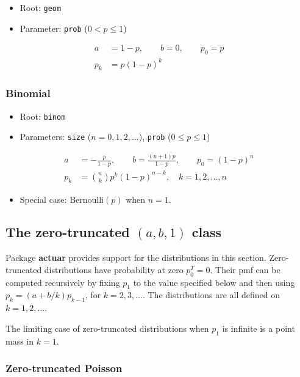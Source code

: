 \documentclass[x11names]{article}
\newcommand{\pkg}[1]{\textbf{#1}}
\newcommand{\code}[1]{\texttt{#1}}
\begin{document}
\begin{itemize}
\item Root: \code{geom}
\item Parameter: \code{prob} ($0 < p \leq 1$)
\end{itemize}
\begin{align*}
  a &= 1 - p, \qquad b = 0, \qquad p_0 = p \\
  p_k &= p (1 - p)^k
\end{align*}

\subsubsection{Binomial}

\begin{itemize}
\item Root: \code{binom}
\item Parameters: \code{size} ($n = 0, 1, 2, \dots$),
  \code{prob} ($0 \leq p \leq 1$)
\end{itemize}
\begin{align*}
  a &= -\frac{p}{1 - p}, \qquad b = \frac{(n + 1)p}{1 - p}, \qquad p_0 = (1 - p)^n \\
  p_k &= \binom{n}{k} p^k (1 - p)^{n - k}, \quad
        k = 1, 2, \dots, n
\end{align*}

\begin{itemize}
\item Special case: Bernoulli$(p)$ when $n = 1$.
\end{itemize}


\subsection[The zero-truncated (a, b, 1) class]{The zero-truncated $(a, b, 1)$ class}
\label{sec:app:discrete:zt}

Package \pkg{actuar} provides support for the distributions in this
section. Zero-truncated distributions have probability at zero
$p_0^T = 0$. Their pmf can be computed recursively by fixing $p_1$ to
the value specified below and then using $p_k = (a + b/k) p_{k - 1}$,
for $k = 2, 3, \dots$. The distributions are all defined on
$k = 1, 2, \dots$.

The limiting case of zero-truncated distributions when $p_1$ is
infinite is a point mass in $k = 1$.

\subsubsection{Zero-truncated Poisson}
\end{document}
